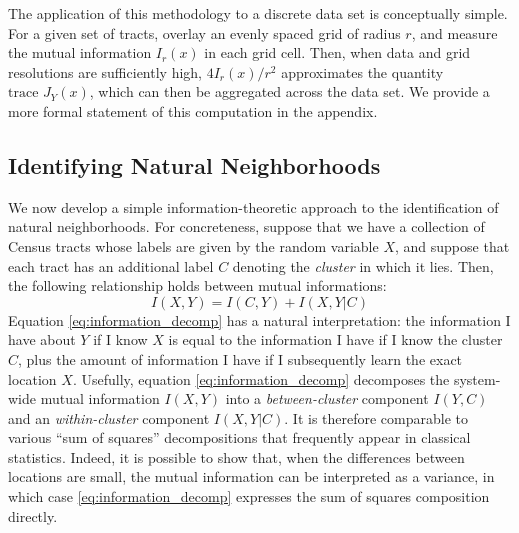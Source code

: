 		The application of this methodology to a discrete data set is conceptually simple. For a given set of tracts, overlay an evenly spaced grid of radius $r$, and measure the mutual information $I_r(x)$ in each grid cell. Then, when data and grid resolutions are sufficiently high, $4I_r(x) / r^2$ approximates the quantity $\text{trace }J_Y(x)$, which can then be aggregated across the data set. We provide a more formal statement of this computation in the appendix. 

	\subsection{Identifying Natural Neighborhoods}
		We now develop a simple information-theoretic approach to the identification of natural neighborhoods. For concreteness, suppose that we have a collection of Census tracts whose labels are given by the random variable $X$, and suppose that each tract has an additional label $C$ denoting the \emph{cluster} in which it lies. Then, the following relationship holds between mutual informations: 
		\begin{equation}
			I(X,Y) = I(C,Y) + I(X,Y|C) \label{eq:information_decomp}
		\end{equation}
		Equation \eqref{eq:information_decomp} has a natural interpretation: the information I have about $Y$ if I know $X$ is equal to the  information I have if I know the cluster $C$, plus the amount of information I have if I subsequently learn the exact location $X$. Usefully, equation \eqref{eq:information_decomp} decomposes the system-wide mutual information $I(X,Y)$ into a \emph{between-cluster} component $I(Y,C)$ and an \emph{within-cluster} component $I(X,Y|C)$. It is therefore comparable to various ``sum of squares'' decompositions that frequently appear in classical statistics. Indeed, it is possible to show that, when the differences between locations are small, the mutual information can be interpreted as a variance, in which case \eqref{eq:information_decomp} expresses the sum of squares composition directly. 

